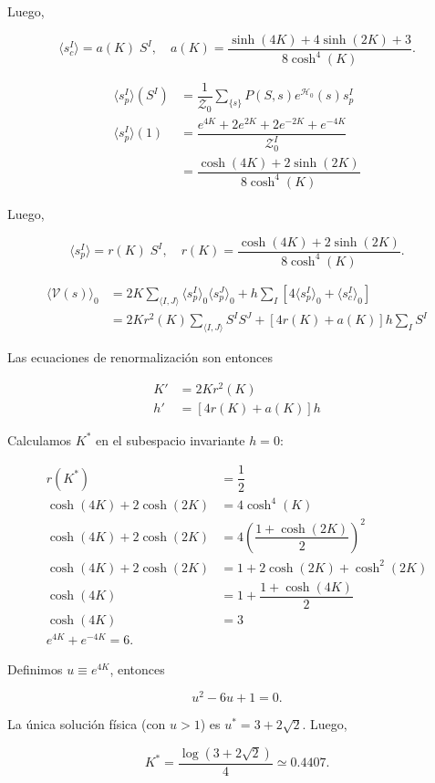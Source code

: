 \documentclass[10pt]{article}
\begin{document}
Luego, 

\begin{equation}
\langle s_c^I \rangle = a(K)\; S^I,\quad a(K) =  \dfrac{\sinh(4K) + 4\sinh(2K) + 3}{8 \cosh^4(K)}.
\end{equation}

\begin{align}
\langle s_p^I \rangle(S^I) &= \dfrac{1}{\mathcal{Z}_0} \sum_{\lbrace s \rbrace} P(S, s) e^{\mathcal{H}_0}(s) s_p^I \nonumber \\
\langle s_p^I \rangle(1)&= \dfrac{e^{4K} + 2 e^{2K} + 2 e^{-2K} + e^{-4K}}{\mathcal{Z}_0^I} \nonumber \\
&= \dfrac{\cosh(4K) + 2\sinh(2K)}{8 \cosh^4(K)}
\end{align}
 
Luego, 

\begin{equation}
\langle s_p^I \rangle = r(K)\; S^I,\quad r(K) =  \dfrac{\cosh(4K) + 2\sinh(2K)}{8 \cosh^4(K)}.
\end{equation}

\begin{align}
\langle \mathcal{V}(s)\rangle_0 &= 2K\sum_{\langle I,J\rangle} \langle s_p^I \rangle_0 \langle s_p^J \rangle_0 + h \sum_I \left[4 \langle s_p^I \rangle_0 + \langle s_c^I \rangle_0 \right] \nonumber \\
&= 2K r^2(K) \sum_{\langle I,J\rangle} S^I S^J +   \left[4 r(K) + a(K) \right] h \sum_I S^I 
\end{align}

Las ecuaciones de renormalizaci\'on son entonces

\begin{align}
K' &= 2Kr^2(K) \\
h' &= \left[ 4r(K)+a(K) \right] h
\end{align}

Calculamos $K^*$ en el subespacio invariante $h=0$:

\begin{align}
r(K^*) &= \dfrac{1}{2} \\
\cosh(4K) + 2 \cosh(2K) &= 4\cosh^4(K) \\
\cosh(4K) + 2\cosh(2K) &= 4 \left(\dfrac{1+\cosh(2K)}{2} \right)^2 \\
\cosh(4K) + 2\cosh(2K) &= 1 + 2\cosh(2K) + \cosh^2(2K) \\
\cosh(4K) &= 1 + \dfrac{1+\cosh(4K)}{2} \\
\cosh(4K) &= 3 \\
e^{4K} + e^{-4K} = 6.
\end{align}

Definimos $u \equiv e^{4K}$, entonces

\begin{equation}
u^2 - 6u + 1 = 0.
\end{equation}

La \'unica soluci\'on f\'isica (con $u>1$) es $u^* = 3+2\sqrt{2}$. Luego, 

\begin{equation}
K^* = \dfrac{\log{(3+2\sqrt{2})}}{4} \simeq 0.4407.
\end{equation}
\end{document}
